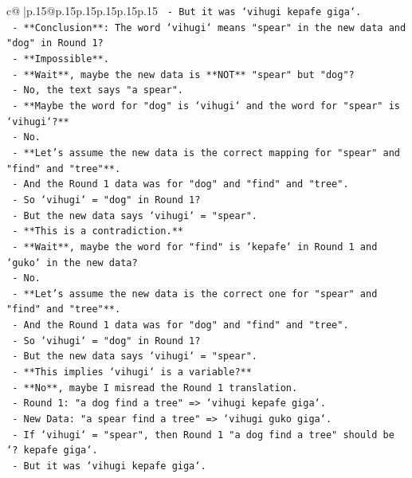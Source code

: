 \documentclass{article}
\begin{document}
{\begin{supertabular}{c@{$\;$}|p{.15\linewidth}@{}p{.15\linewidth}p{.15\linewidth}p{.15\linewidth}p{.15\linewidth}p{.15\linewidth}}
{{{\texttt{    {-} But it was `vihugi kepafe giga`.} \\
\texttt{    {-} **Conclusion**: The word `vihugi` means "spear" in the new data and "dog" in Round 1?} \\
\texttt{    {-} **Impossible**.} \\
\texttt{    {-} **Wait**, maybe the new data is **NOT** "spear" but "dog"?} \\
\texttt{    {-} No, the text says "a spear".} \\
\texttt{    {-} **Maybe the word for "dog" is `vihugi` and the word for "spear" is `vihugi`?**} \\
\texttt{    {-} No.} \\
\texttt{    {-} **Let's assume the new data is the correct mapping for "spear" and "find" and "tree"**.} \\
\texttt{    {-} And the Round 1 data was for "dog" and "find" and "tree".} \\
\texttt{    {-} So `vihugi` = "dog" in Round 1?} \\
\texttt{    {-} But the new data says `vihugi` = "spear".} \\
\texttt{    {-} **This is a contradiction.**} \\
\texttt{    {-} **Wait**, maybe the word for "find" is `kepafe` in Round 1 and `guko` in the new data?} \\
\texttt{    {-} No.} \\
\texttt{    {-} **Let's assume the new data is the correct one for "spear" and "find" and "tree"**.} \\
\texttt{    {-} And the Round 1 data was for "dog" and "find" and "tree".} \\
\texttt{    {-} So `vihugi` = "dog" in Round 1?} \\
\texttt{    {-} But the new data says `vihugi` = "spear".} \\
\texttt{    {-} **This implies `vihugi` is a variable?**} \\
\texttt{    {-} **No**, maybe I misread the Round 1 translation.} \\
\texttt{    {-} Round 1: "a dog find a tree" => `vihugi kepafe giga`.} \\
\texttt{    {-} New Data: "a spear find a tree" => `vihugi guko giga`.} \\
\texttt{    {-} If `vihugi` = "spear", then Round 1 "a dog find a tree" should be `? kepafe giga`.} \\
\texttt{    {-} But it was `vihugi kepafe giga`.} \\
}}}
\end{supertabular}}
\end{document}
